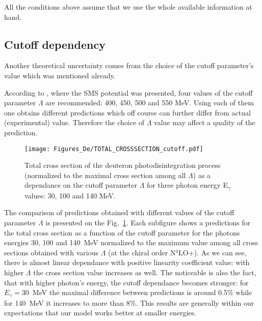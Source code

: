     All the conditions above assume that we use the whole available information at hand.
    


    \subsection*{Cutoff dependency}



    Another theoretical uncertainty comes from the choice of the cutoff parameter's value 
    which was mentioned already.

   According to \cite{reinkrebs2018}, where the SMS potential was presented,
   four values of the cutoff parameter $\Lambda$ are recommended: 400, 450, 500 and 550 MeV.
   Using each of them one obtains different predictions which off course can further differ 
   from actual (experimental) value. Therefore the choice of $\Lambda$ value
   may affect a quality of the prediction.


   \begin{figure}[h]
    \begin{center}
        \texttt{[image: Figures\_De/TOTAL\_CROSSSECTION\_cutoff.pdf]}
    \end{center}
    \caption{Total cross section of the deuteron photodisintegration
    process (normalized to the maximal cross section among all $\Lambda$)
    as a dependance on the cutoff parameter $\Lambda$ 
    for three photon energy E$_\gamma$ values: 30, 100 and 140 MeV.}
    \label{Cutoff_dep}
    \end{figure}

    The comparison of predictions obtained with different values of the 
    cutoff parameter $\Lambda$ is presented on the Fig.~\ref{Cutoff_dep}.
    Each subfigure shows a predictions for the total cross section as 
    a function of the cutoff parameter for the photons energies 30, 100 and 140~MeV
    normalized to the maximum value among all cross sections
    obtained with various $\Lambda$ 
    (at the chiral order N$^4$LO+).
    As we can see,
    there is almost linear dependance with positive linearity coefficient value:
    with higher $\Lambda$ the cross section value increases as well.
    The noticeable is also the fact, that with higher photon's energy,
    the cutoff dependance becomes stronger: for $E_\gamma=30$~MeV
    the maximal difference between predictions is around 0.5\% while
    for 140~MeV it increases to more than 8\%. This results are
    generally within our expectations that our model works better at
    smaller energies. 























